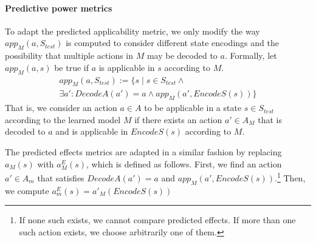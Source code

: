 \documentclass{article}
\theoremstyle{definition}
\theoremstyle{remark}
\newcommand{\stest}{\ensuremath{S_{\textit{test}}}\xspace}
\newcommand{\app}{\ensuremath{\textit{app}}\xspace}
\newcommand{\encodes}{\textit{EncodeS}\xspace}
\newcommand{\decodea}{\textit{DecodeA}\xspace}
\begin{document}





\paragraph{Predictive power metrics}
To adapt the predicted applicability metric, we only modify the way $\app_M(a,\stest)$ is computed to consider different state encodings and the possibility that multiple actions in $M$ may be decoded to $a$. 
Formally, let $\app_M(a,s)$ be true if $a$ is applicable in $s$ according to $M$. 
\begin{multline}
    \app_M(a,\stest):=\{s \mid s\in\stest  \wedge \\
        \exists a': \decodea(a')=a  
        \wedge \app_M(a',\encodes(s))\}    
\end{multline}
That is, we consider an action $a\in A$ to be applicable in a state $s\in\stest$ according to the learned model $M$ if there exists an action $a'\in A_M$ that is decoded to $a$ and is applicable in $\encodes(s)$ according to $M$. 

The predicted effects metrics are adapted in a similar fashion
by replacing $a_M(s)$ with $a^E_M(s)$, which is defined as follows. 
First, we find an action $a'\in A_m$ that satisfies $\decodea(a')=a$ and 
$\app_M(a',\encodes(s))$.\footnote{If none such exists, we cannot compare predicted effects. If more than one such action exists, we choose arbitrarily one of them.} 
Then, we compute $a^E_m(s)=a'_M(\encodes(s))$
\end{document}
